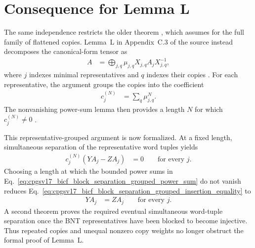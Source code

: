 \documentclass{article}
\begin{document}
\section{Consequence for Lemma L}

The same independence restricts the older theorem
, which assumes  for the
full family of flattened copies. Lemma~L in Appendix~C.3 of the source instead
decomposes the canonical-form tensor as
\begin{align}
    A
        &= \bigoplus_{j,q}
            \mu_{j,q}X_{j,q}A_jX_{j,q}^{-1},
    \label{eq:cpgsv17_bicf_block_separation_sector_decomposition}
\end{align}
where $j$ indexes minimal representatives and $q$ indexes their copies
\cite[lines~1835--1858]{Cirac2016MPDO_arXiv}. For each representative, the
argument groups the copies into the coefficient
\begin{align}
    c_j^{(N)}
        &= \sum_q \mu_{j,q}^{N}.
    \label{eq:cpgsv17_bicf_block_separation_grouped_power_sum}
\end{align}
The nonvanishing power-sum lemma then provides a length $N$ for which
$c_j^{(N)}\ne0$ \cite{Cirac2016MPDO_arXiv}.

This representative-grouped argument is now formalized. At a fixed length,
simultaneous separation of the representative word tuples yields
\begin{align}
    c_j^{(N)}\left(YA_j-ZA_j\right)
        &=0
        \qquad\text{for every }j.
    \label{eq:cpgsv17_bicf_block_separation_grouped_insertion_equality}
\end{align}
Choosing a length at which the bounded power sums in
Eq.~\ref{eq:cpgsv17_bicf_block_separation_grouped_power_sum} do not vanish
reduces
Eq.~\ref{eq:cpgsv17_bicf_block_separation_grouped_insertion_equality} to
\begin{align}
    YA_j
        &= ZA_j
        \qquad\text{for every }j.
    \label{eq:cpgsv17_bicf_block_separation_representative_insertion_equality}
\end{align}
A second theorem proves the required eventual simultaneous word-tuple
separation once the BNT representatives have been blocked to become
injective. Thus repeated copies and unequal nonzero copy weights no longer
obstruct the formal proof of Lemma~L.
\end{document}
